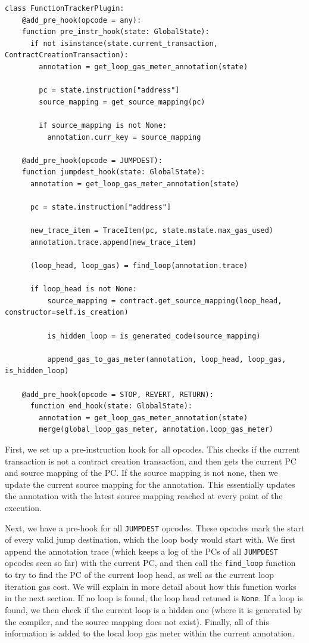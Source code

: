 \begin{lstlisting}[language=Pseudocode, caption={Hooks implemented for loop gas meter plugin}, label={lst:loop_gas_meter_hooks}, basicstyle=\ttfamily\scriptsize]
  class FunctionTrackerPlugin:
    @add_pre_hook(opcode = any):
    function pre_instr_hook(state: GlobalState):
      if not isinstance(state.current_transaction, ContractCreationTransaction):
        annotation = get_loop_gas_meter_annotation(state)
        
        pc = state.instruction["address"]
        source_mapping = get_source_mapping(pc)

        if source_mapping is not None:
          annotation.curr_key = source_mapping

    @add_pre_hook(opcode = JUMPDEST):
    function jumpdest_hook(state: GlobalState):
      annotation = get_loop_gas_meter_annotation(state)
              
      pc = state.instruction["address"]
      
      new_trace_item = TraceItem(pc, state.mstate.max_gas_used)
      annotation.trace.append(new_trace_item)
      
      (loop_head, loop_gas) = find_loop(annotation.trace)
      
      if loop_head is not None:
          source_mapping = contract.get_source_mapping(loop_head, constructor=self.is_creation)
      
          is_hidden_loop = is_generated_code(source_mapping)
              
          append_gas_to_gas_meter(annotation, loop_head, loop_gas, is_hidden_loop)

    @add_pre_hook(opcode = STOP, REVERT, RETURN):
      function end_hook(state: GlobalState):
        annotation = get_loop_gas_meter_annotation(state)
        merge(global_loop_gas_meter, annotation.loop_gas_meter)
\end{lstlisting}

First, we set up a pre-instruction hook for all opcodes. This checks if the current transaction 
is not a contract creation transaction, and then gets the current PC and source mapping of the PC.
If the source mapping is not none, then we update the current source mapping for the annotation.
This essentially updates the annotation with the latest source mapping reached at every point of
the execution.

Next, we have a pre-hook for all \texttt{JUMPDEST} opcodes. These opcodes mark the start of every 
valid jump destination, which the loop body would start with. We first append the annotation
trace (which keeps a log of the PCs of all \texttt{JUMPDEST} opcodes seen so far) with the 
current PC, and then call the \texttt{find_loop} function to try to find the PC of the current loop head,
as well as the current loop iteration gas cost. We will explain in more detail about how this 
function works in the next section.
If no loop is found, the loop head retuned is \texttt{None}.
If a loop is found, we then check if the current loop is a hidden one (where it is generated by the compiler, 
and the source mapping does not exist). 
Finally, all of this information is added to the local loop gas meter within the current annotation.

